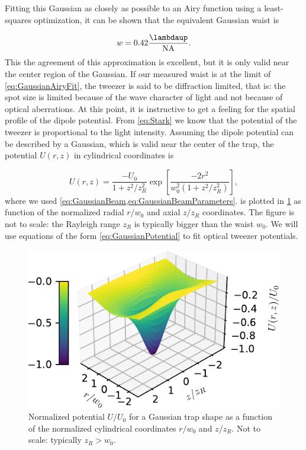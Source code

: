 Fitting this Gaussian as closely as possible to an Airy function using a least-squares optimization, it can be shown that the equivalent Gaussian waist is \cite{Zhang2007}

\begin{equation}\label{eq:GaussianAiryFit}
    w = 0.42 \frac{\lambdaup}{\text{NA}}.
\end{equation}
This the agreement of this approximation is excellent, but it is only valid near the center region of the Gaussian. 
If our measured waist is at the limit of \cref{eq:GaussianAiryFit}, the tweezer is said to be diffraction limited, that is: the spot size is limited because of the wave character of light and not because of optical aberrations. 
At this point, it is instructive to get a feeling for the spatial profile of the dipole potential.
From \cref{eq:Stark} we know that the potential of the tweezer is proportional to the light intensity. 
Assuming the dipole potential can be described by a Gaussian, which is valid \cite{Zhang2007} near the center of the trap, the potential $U(r,z)$ in cylindrical coordinates is

\begin{equation}\label{eq:GaussianPotential}
    U(r,z)=\frac{-U_{0}}{1+z^{2} / z_{R}^{2}} \exp \left[\frac{-2 r^{2}}{w_{0}^{2}\left(1+z^{2} / z_{R}^{2}\right)}\right],
\end{equation}
where we used \cref{eq:GaussianBeam,eq:GaussianBeamParameters}.
 is plotted in \cref{fig:GaussianPotential} as function of the normalized radial $r/w_0$ and axial $z/z_R$ coordinates. 
The figure is not to scale: the Rayleigh range $z_R$ is typically bigger than the waist $w_0$.
We will use equations of the form \cref{eq:GaussianPotential} to fit optical tweezer potentials.

\begin{figure}
    \centering
    \includegraphics[width=.67\linewidth]{figures/GaussianPotential.pdf}
    \caption{Normalized potential $U/U_0$ for a Gaussian trap shape as a function of the normalized cylindrical coordinates $r/w_0$ and $z/z_R$. Not to scale: typically $z_R > w_0$.}
    \label{fig:GaussianPotential}
\end{figure}

